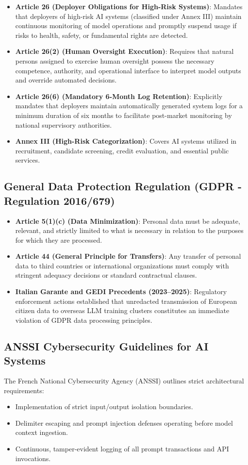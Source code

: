 \documentclass[11pt,a4paper]{article}
\theoremstyle{definition}
\begin{document}
\begin{itemize}
    \item \textbf{Article 26 (Deployer Obligations for High-Risk Systems)}: Mandates that deployers of high-risk AI systems (classified under Annex III) maintain continuous monitoring of model operations and promptly suspend usage if risks to health, safety, or fundamental rights are detected.
    \item \textbf{Article 26(2) (Human Oversight Execution)}: Requires that natural persons assigned to exercise human oversight possess the necessary competence, authority, and operational interface to interpret model outputs and override automated decisions.
    \item \textbf{Article 26(6) (Mandatory 6-Month Log Retention)}: Explicitly mandates that deployers maintain automatically generated system logs for a minimum duration of six months to facilitate post-market monitoring by national supervisory authorities.
    \item \textbf{Annex III (High-Risk Categorization)}: Covers AI systems utilized in recruitment, candidate screening, credit evaluation, and essential public services.
\end{itemize}

\subsection{General Data Protection Regulation (GDPR - Regulation 2016/679)}
\begin{itemize}
    \item \textbf{Article 5(1)(c) (Data Minimization)}: Personal data must be adequate, relevant, and strictly limited to what is necessary in relation to the purposes for which they are processed.
    \item \textbf{Article 44 (General Principle for Transfers)}: Any transfer of personal data to third countries or international organizations must comply with stringent adequacy decisions or standard contractual clauses.
    \item \textbf{Italian Garante and GEDI Precedents (2023--2025)}: Regulatory enforcement actions established that unredacted transmission of European citizen data to overseas LLM training clusters constitutes an immediate violation of GDPR data processing principles.
\end{itemize}

\subsection{ANSSI Cybersecurity Guidelines for AI Systems}
The French National Cybersecurity Agency (ANSSI) outlines strict architectural requirements:
\begin{itemize}
    \item Implementation of strict input/output isolation boundaries.
    \item Delimiter escaping and prompt injection defenses operating before model context ingestion.
    \item Continuous, tamper-evident logging of all prompt transactions and API invocations.
\end{itemize}
\end{document}
